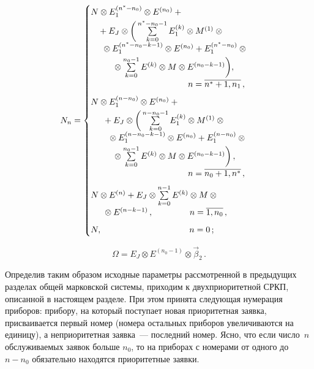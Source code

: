 \begin{multicols}{2}
\noindent
$$
N_n =
\begin{cases}
N \otimes E_1^{(n^*-n_0)}
\otimes E^{(n_0)} +{}\\[2pt]
\hspace*{3mm}{}+
E_J \otimes
\bigg(
\sum\limits_{k=0}^{n^*-n_0-1}
E_1^{(k)} \otimes
M^{(1)}
\otimes{}\\[2pt]
\hspace*{4.5mm}{}\otimes E_1^{(n^*-n_0-k-1)}
\otimes E^{(n_0)}
 +
E_1^{(n^*-n_0)} \otimes{}\\[2pt]
\hspace*{9mm}{}\otimes
\sum\limits_{k=0}^{n_0-1}
E^{(k)} \otimes
M \otimes E^{(n_0-k-1)}
\bigg),\\[3pt]
          \hspace*{40mm}n=\overline{n^*+1,n_1}\,,    \\[6pt]
N \otimes E_1^{(n-n_0)}
\otimes E^{(n_0)} +{}\\[2pt]
\hspace*{5mm}{}+
E_J \otimes
\bigg(
\sum\limits_{k=0}^{n-n_0-1}
E_1^{(k)} \otimes
M^{(1)} \otimes{}\\[2pt]
\hspace*{7mm}{}\otimes
E_1^{(n-n_0-k-1)} \otimes E^{(n_0)}
+
E_1^{(n-n_0)} \otimes{}\\[2pt]
\hspace*{9mm}{}\otimes
\sum\limits_{k=0}^{n_0-1}
E^{(k)} \otimes
M \otimes E^{(n_0-k-1)}
\bigg)\,,\\[3pt]
            \hspace*{40mm}n=\overline{n_0+1,n^*}\,,  \\[6pt]
N \otimes E^{(n)} +
E_J \otimes
\sum\limits_{k=0}^{n-1}
E^{(k)} \otimes
M \otimes{}\\[2pt]
\hspace*{5mm}{}\otimes E^{(n-k-1)}\,, \hspace*{15mm}n=\overline{1,n_0}\,,     \\[6pt]
N,\hspace{36mm} n=0\,;                   
                     \end{cases}
$$

\noindent
$$
\Omega = E_J \otimes E^{(n_0-1)} \otimes \vec\beta_2\,.
$$

Определив таким образом исходные
параметры рассмотренной в предыдущих разделах общей
марковской системы, приходим к двухприоритетной СРКП,
описанной в настоящем разделе.
При этом принята следующая нумерация приборов: прибору,
на который поступает новая приоритетная заявка,
присваивается первый номер (номера остальных приборов
увеличиваются на единицу), а неприоритетная заявка~---
последний номер.
Ясно, что если число~$n$ обслуживаемых заявок больше
$n_0$, то на приборах с номерами от одного до $n-n_0$
обязательно находятся приоритетные заявки.


\end{multicols}
